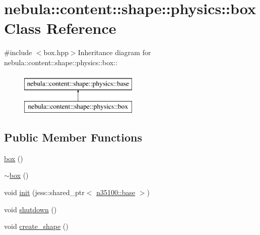 \hypertarget{classnebula_1_1content_1_1shape_1_1physics_1_1box}{
\section{nebula::content::shape::physics::box Class Reference}
\label{classnebula_1_1content_1_1shape_1_1physics_1_1box}
}


{\ttfamily \#include $<$box.hpp$>$}Inheritance diagram for nebula::content::shape::physics::box::\begin{figure}[H]
\begin{center}
\leavevmode
\includegraphics[height=2cm]{classnebula_1_1content_1_1shape_1_1physics_1_1box}
\end{center}
\end{figure}
\subsection*{Public Member Functions}
\begin{DoxyCompactItemize}
\item 
\hyperlink{classnebula_1_1content_1_1shape_1_1physics_1_1box_a8c863aef9d96cade002947380b85f407}{box} ()
\item 
\hyperlink{classnebula_1_1content_1_1shape_1_1physics_1_1box_a838df4a991e498b748ec2c034e6c3e4a}{$\sim$box} ()
\item 
void \hyperlink{classnebula_1_1content_1_1shape_1_1physics_1_1box_ae2378ed04f339cdb0874a9a680a44576}{init} (jess::shared\_\-ptr$<$ \hyperlink{classnebula_1_1content_1_1shape_1_1admin_1_1base}{n35100::base} $>$)
\item 
void \hyperlink{classnebula_1_1content_1_1shape_1_1physics_1_1box_a798aaaef8d3f5535e3aea4eabf19924c}{shutdown} ()
\item 
void \hyperlink{classnebula_1_1content_1_1shape_1_1physics_1_1box_ae09f21744de13654524989b9b4c4408e}{create\_\-shape} ()
\end{DoxyCompactItemize}


